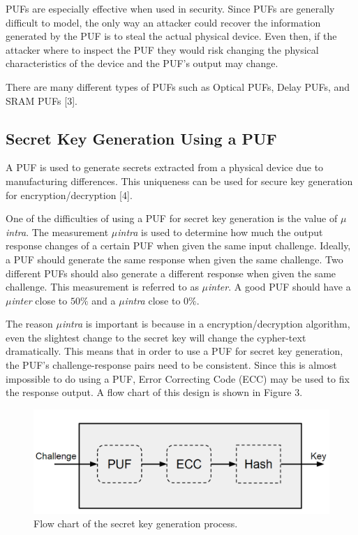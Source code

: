 \documentclass[letterpaper, 10pt, conference]{ieeeconf}  %
\begin{document}
PUFs are especially effective when used in security.  Since PUFs are generally difficult to model, the only way an attacker could recover the information generated by the PUF is to steal the actual physical device.  Even then, if the attacker where to inspect the PUF they would risk changing the physical characteristics of the device and the PUF's output may change.

There are many different types of PUFs such as Optical PUFs, Delay PUFs, and SRAM PUFs [3].

\subsection{Secret Key Generation Using a PUF}

A PUF is used to generate secrets extracted from a physical device due to manufacturing differences. This uniqueness can be used for secure key generation for encryption/decryption [4].

One of the difficulties of using a PUF for secret key generation is the value of \emph{$\mu$intra}.  The measurement \emph{$\mu$intra} is used to determine how much the output response changes of a certain PUF when given the same input challenge.  Ideally, a PUF should generate the same response when given the same challenge.  Two different PUFs should also generate a different response when given the same challenge.  This measurement is referred to as \emph{$\mu$inter}.  A good PUF should have a \emph{$\mu$inter} close to $50\%$ and a \emph{$\mu$intra} close to $0\%$.

The reason \emph{$\mu$intra} is important is because in a encryption/decryption algorithm, even the slightest change to the secret key will change the cypher-text dramatically.  This means that in order to use a PUF for secret key generation, the PUF's challenge-response pairs need to be consistent.  Since this is almost impossible to do using a PUF, Error Correcting Code (ECC) may be used to fix the response output.  A flow chart of this design is shown in Figure 3.

\begin{figure}[thpb]
	\centering
	\includegraphics[scale=.25]{keyGen}
   \caption{Flow chart of the secret key generation process.}
\end{figure}
\end{document}
